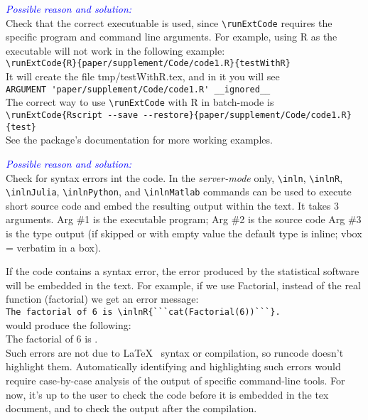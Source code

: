 \documentclass[a4paper,10pt]{article}
\newcommand{\cause}[1] {\noindent\textit{\textcolor{blue}{Possible reason and solution:}}\\#1}
\begin{document}
\cause\bgroup
Check that the correct executuable is used, since \verb|\runExtCode| requires the specific program and command line arguments. For example, using R as the executable will not work in the following example:\\
\verb|\runExtCode{R}{paper/supplement/Code/code1.R}{testWithR}|\\
It will create the file tmp/testWithR.tex, and in it you will see\\
\verb|ARGUMENT 'paper/supplement/Code/code1.R' __ignored__|\\
\noindent
The correct way to use \verb|\runExtCode| with R in batch-mode is\\
\verb|\runExtCode{Rscript --save --restore}{paper/supplement/Code/code1.R}{test}|\\
See the package's documentation for more working examples.\\
\egroup


\cause\bgroup
Check for syntax errors int the code.
In the \textit{server-mode} only, \verb|\inln|, \verb|\inlnR|, \verb|\inlnJulia|, \verb|\inlnPython|, and \verb|\inlnMatlab| commands can be used to execute short source code and embed the resulting output within the text. It takes 3 arguments.
Arg \#1 is the executable program;
Arg \#2 is the source code
Arg \#3 is the type output (if skipped or with empty value the default type is inline; vbox = verbatim in a box).

\noindent If the code contains a syntax error, the error produced by the statistical software will be embedded in the text. For example, if we use Factorial, instead of the real function (factorial) we get an error message:\\
\verb|The factorial of 6 is \inlnR{```cat(Factorial(6))```}.|\\
would produce the following:\\
The factorial of 6 is .\\

\noindent Such errors are not due to \LaTeX~ syntax or compilation, so runcode doesn't highlight them. Automatically identifying and highlighting such errors would require case-by-case analysis of the output of specific command-line tools. For now, it's up to the user to check the code before it is embedded in the tex document, and to check the output after the compilation.
\egroup
\end{document}
